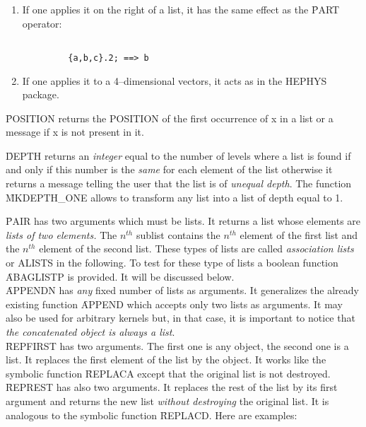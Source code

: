\begin{itemize}
\begin{enumerate}
\begin{verbatim}
        4 . {a,b}; ==> {4,a,b}

\end{verbatim}
\item If one applies it on the right of a list, it has the same
effect as the \f{PART} operator:
\begin{verbatim}

         {a,b,c}.2; ==> b

\end{verbatim}
\item If one applies it to  a 4--dimensional vectors, it acts as in the
HEPHYS package.
\end{enumerate}
\f{POSITION} returns the POSITION of the first occurrence of x in
a list or a message if x is not present in it.

\f{DEPTH} returns an {\em integer} equal to the number of levels where a
   list is found if and only if this number is the {\em same} for each
   element of the list  otherwise it returns a message telling the user
  that the list is of {\em unequal depth}. The function \f{MKDEPTH\_ONE}
  allows to transform any list into a list of depth equal to 1.

\f{PAIR} has two arguments which must be lists. It returns a list
whose elements are {\em lists of two elements.}
The $n^{th}$ sublist contains the $n^{th}$ element of the first list
and the $n^{th}$ element of the second list. These types of lists are called
{\em association lists} or ALISTS in the following.
To test for these type of lists a boolean function \f{ABAGLISTP}
is provided. It will be discussed below.\\
\f{APPENDN} has {\em any} fixed number of lists as arguments. It
generalizes the already existing function \f{APPEND} which accepts
only two lists as arguments. It may also be used for arbitrary kernels 
but, in that case, it is important to notice that {\em the concatenated 
object is always a list}.\\
\f{REPFIRST} has two arguments. The first one is any object, the second one
is a list. It replaces the first element of the list by the object. It
works like the symbolic function \f{REPLACA} except that the
original list is not destroyed.\\
\f{REPREST} has also two arguments. It replaces the rest of the list by
its first argument and returns the new list {\em without destroying} the
original list. It is analogous to the symbolic function \f{REPLACD}.
Here are examples:
\begin{verbatim}


\end{verbatim}
\end{itemize}
